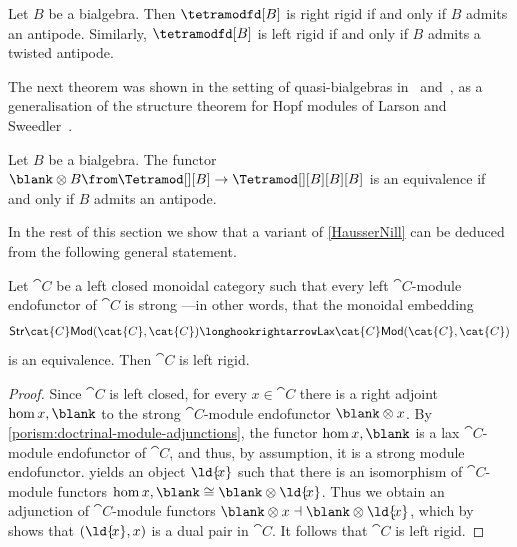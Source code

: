 \begin{lemma}\label{antipodeleftrigid}
  Let \(B\) be a bialgebra.
  Then \(\tetramodfd[B]\) is right rigid if and only if \(B\) admits an antipode.
  Similarly, \(\tetramodfd[B]\) is left rigid if and only if \(B\) admits a twisted antipode.
\end{lemma}

The next theorem was shown
in the setting of quasi-bialgebras
in~\cite[Proposition~3.11]{hausser99:integ-theor-quasi-hopf-algeb}
and~\cite[Theorem~3.9]{saracco17:hopf},
as a generalisation of the structure theorem for Hopf modules of Larson and Sweedler~\cite{larson69:hopf}.

\begin{theorem}\label{HausserNill}
  Let \(B\) be a bialgebra.
  The functor \(\blank \otimes B\from \Tetramod[][B] \to \Tetramod[][B][B][B]\) is an equivalence if and only if \(B\) admits an antipode.
\end{theorem}

In the rest of this section we show that a variant of \cref{HausserNill} can be deduced
from the following general statement.

\begin{proposition}\label{LaxIsStrongThenLeftRigid}
  Let \(\cat{C}\) be a left closed monoidal category such that every left \(\cat{C}\)\hyp{}module endofunctor of \(\cat{C}\) is strong%
  —in other words, that the monoidal embedding
  \[
    \mathsf{Str}\cat{C}\mathsf{Mod}(\cat{C},\cat{C}) \longhookrightarrow \mathsf{Lax}\cat{C}\mathsf{Mod}(\cat{C},\cat{C})
  \]
  is an equivalence.
  Then \(\cat{C}\) is left rigid.
\end{proposition}
\begin{proof}
  Since \(\cat{C}\) is left closed,
  for every \(x \in \cat{C}\) there is a right adjoint \(\hom{x, \blank}\) to the strong \(\cat{C}\)\hyp{}module endofunctor \(\blank \otimes x\).
  By \cref{porism:doctrinal-module-adjunctions},
  the functor \(\hom{x, \blank}\) is a lax \(\cat{C}\)\hyp{}module endofunctor of \(\cat{C}\),
  and thus, by assumption, it is a strong module endofunctor.
   yields an object \(\ld{\!{}x}\)
  such that there is an isomorphism of \(\cat{C}\)\hyp{}module functors \(\hom{x, \blank} \cong \blank \otimes \ld{\!{}x}\).
  Thus we obtain an adjunction of \(\cat{C}\)\hyp{}module functors \(\blank \otimes x \dashv \blank \otimes \ld{\!{}x}\),
  which by~\cite[102-103]{kelly72:many} shows that \((\ld{\!{}x}, x)\) is a dual pair in \(\cat{C}\).
  It follows that \(\cat{C}\) is left rigid.
\end{proof}


